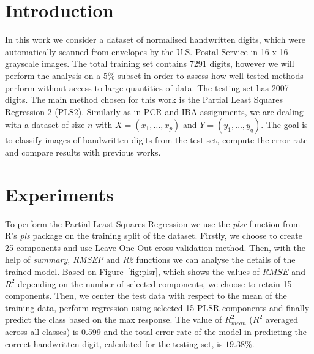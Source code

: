 \documentclass[a4,12pt]{article}
\begin{document}
    \section{Introduction}

    In this work we consider a dataset of normalised handwritten digits, which were automatically scanned from envelopes by the U.S. Postal Service in 16 x 16 grayscale images.
    The total training set contains 7291 digits, however we will perform the analysis on a 5\% subset in order to assess how well tested methods perform without access to large quantities of data.
    The testing set has 2007 digits.
    The main method chosen for this work is the Partial Least Squares Regression 2 (PLS2).
    Similarly as in PCR and IBA assignments, we are dealing with a dataset of size $n$ with $X = (x_1, \ldots, x_p)$ and $Y = (y_1, \ldots, y_q)$.
    The goal is to classify images of handwritten digits from the test set, compute the error rate and compare results with previous works.

    \section{Experiments}

    To perform the Partial Least Squares Regression we use the \textit{plsr} function from R's \textit{pls} package on the training split of the dataset.
    Firstly, we choose to create 25 components and use Leave-One-Out cross-validation method.
    Then, with the help of \textit{summary}, \textit{RMSEP} and \textit{R2} functions we can analyse the details of the trained model.
    Based on Figure~\ref{fig:plsr}, which shows the values of $RMSE$ and $R^2$ depending on the number of selected components, we choose to retain 15 components.
    Then, we center the test data with respect to the mean of the training data, perform regression using selected 15 PLSR components and finally predict the class based on the max response.
    The value of $R^2_{mean}$ ($R^2$ averaged across all classes) is 0.599 and the total error rate of the model in predicting the correct handwritten digit, calculated for the testing set, is $19.38\%$.
\end{document}
